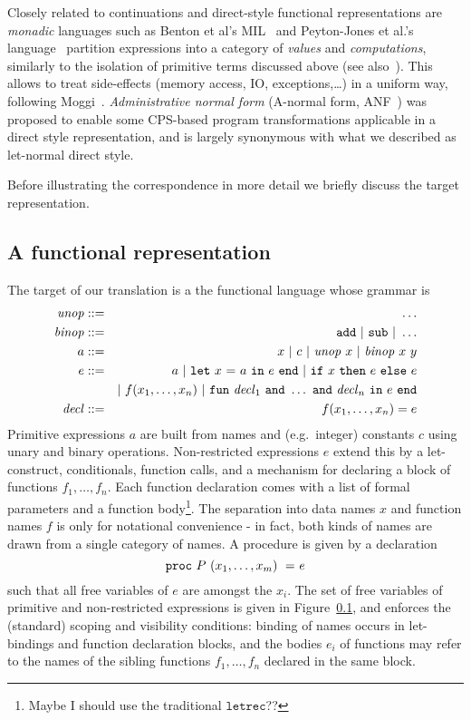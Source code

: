 Closely related to continuations and direct-style functional representations are
\emph{monadic} languages such as Benton et al's MIL~\cite{BentonKennedyRussel:ICFP1998} and  Peyton-Jones et al.'s language~\cite{PeytonJonesShieldsLT:POPL1998} partition expressions into a category of \emph{values} and \emph{computations}, similarly to the isolation of primitive terms discussed above (see also~\cite{Reynolds1974,Plotkin75}). This allows to treat side-effects (memory access, IO, exceptions,\ldots) in a uniform way, following Moggi~\cite{Moggi1991}. 
\emph{Administrative normal form} (A-normal form, ANF~\cite{}) was proposed to enable some CPS-based program transformations applicable in a direct style representation, and is largely synonymous with what we described as let-normal direct style.

Before illustrating the correspondence in more detail we briefly
discuss the target representation.


\subsection{A functional representation}
The target of our translation is a the
functional language whose grammar is
\begin{eqnarray*}
\uopsymbol & ::= & \ldots\\
\bopsymbol & ::= & \mathtt{add} \ | \ \mathtt{sub} \ | \ \ldots\\
a & ::= & x \ | \ c \ | \ \uop x \ | \ \bop x y\\
e & ::= & a \ | \ \letin x a e \ | \ \ite x e e \\
      & & | \ \call f {x_1,\ldots,x_n} \ | \ \letrec {\decl_1 \ \mathtt{and}\ \ldots \ \mathtt{and}\ \decl_n} e\\
\decl & ::= & f(x_1,\ldots,x_n) = e
\end{eqnarray*}
Primitive expressions $a$ are built from names and (e.g.~integer)
constants $c$ using unary and binary operations. Non-restricted
expressions $e$ extend this by a let-construct, conditionals, function
calls, and a mechanism for declaring a block of functions
$f_1,\ldots,f_n$. Each function declaration comes with a list of
formal parameters and a function body\footnote{Maybe I should use the
traditional $\mathtt{letrec}$??}. The separation into data names $x$
and function names $f$ is only for notational convenience - in fact,
both kinds of names are drawn from a single category of names. A
procedure is given by a declaration $$\mathtt{proc}\  {P}\ \mathtt{(}{x_1,\ldots,x_m}\mathtt{)\ =} \ {e}$$ such
that all free variables of $e$ are amongst the $x_i$. The set of free
variables of primitive and non-restricted expressions is given in
Figure~\ref{}, and enforces the (standard) scoping and visibility
conditions: binding of names occurs in let-bindings and function
declaration blocks, and the bodies $e_i$ of functions may refer to 
the names of the sibling functions $f_1,\ldots,f_n$ declared in the
same block.

